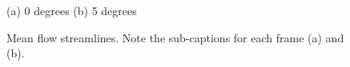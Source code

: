 \documentclass[11pt,a4]{article}
\begin{document}
\begin{figure}[htp]
\centering
(a) 0 degrees \hspace{5cm} (b) 5 degrees
 \caption{Mean flow streamlines. Note the sub-captions for each frame (a) and (b).}
\label{slines} 
\end{figure}



%
% 
%
\end{document}
